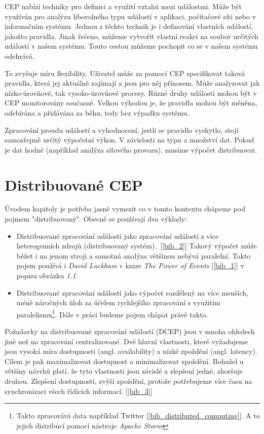 \documentclass[
  digital, %
  table,   %
  nolof,     %
  nolot,     %
  oneside, %
  nocover,
  monochrome,
  12pt
]{fithesis3}
\begin{document}
CEP nabízí techniky pro definici a využití vztahů mezi událostmi. Může být využíván pro analýzu libovolného typu událostí v aplikaci, počítačové síti nebo v informačním systému. Jednou z těchto technik je i definování vlastních událostí, jakožto pravidla. Jinak řečeno, můžeme vytvořit vlastní reakci na soubor určitých událostí v našem systému. Touto cestou můžeme pochopit co se v našem systému odehrává.

To zvyšuje míru flexibility. Uživatel může za pomocí CEP specifikovat taková pravidla, která jej aktuálně zajímají a jsou pro něj přínosem. Může analyzovat jak nízko-úrovňové, tak vysoko-úrovňové procesy. Různé druhy událostí mohou být v CEP monitorovány současně. Velkou výhodou je, že pravidla mohou být měněna, odebírána a přidávána za běhu, tedy bez výpadku systému.

Zpracování proudu událostí a vyhodnocení, jestli se pravidlo vyskytlo, stojí samozřejmě určitý výpočetní výkon. V závislosti na typu a množství dat. Pokud je dat hodně (například analýza síťového provozu), musíme výpočet distribuovat.
 
\section{Distribuované CEP}
Úvodem kapitoly je potřeba jasně vymezit co v tomto kontextu chápeme pod pojmem "distribuovaný". Obecně se používají dva výklady:
\begin{itemize}
  \item Distribuované zpracování událostí jako zpracování událostí z více heterogenních zdrojů (distribuovaný systém).~[\ref{bib_2}] Takový výpočet může běžet i na jenom stroji a samotná analýza většinou nebývá paralelní. Takto pojem používá i \textit{David Luckham} v knize \textit{The Power of Events} [\ref{bib_1}] v popisu obrázku \textit{1.1}.
  \item Distribuované zpracování událostí jako výpočet rozdělený na více menších, méně náročných úloh za účelem rychlejšího zpracování s využitím paralelismu\footnote{Takto zpracovává data například Twitter [\ref{bib_distributed_computing}]. A to jejich distribucí pomocí nástroje \textit{Apache Storm}}. Dále v práci budeme pojem chápat právě takto.
\end{itemize}

Požadavky na distribuované zpracování událostí (DCEP) jsou v mnoha ohledech jiné než na zpracování centralizované. Dvě hlavní vlastnosti, které vyžadujeme jsou vysoká míra dostupnosti (angl. availability) a nízké zpoždění (angl. latency). Cílem je pak maximalizovat dostupnost a minimalizovat zpoždění. Bohužel u většiny návrhů platí, že tyto vlastnosti jsou závislé a zlepšení jedné, zhoršuje druhou. Zlepšení dostupnosti, zvýší zpoždění, protože potřebujeme více času na synchronizaci všech řídících informací. [\ref{bib_3}]
\end{document}
